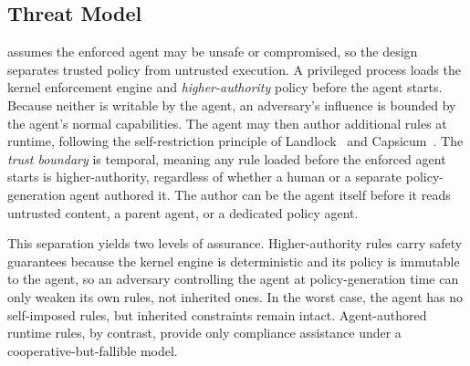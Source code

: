 \subsection{Threat Model}

\sys{} assumes the enforced agent may be unsafe or compromised, so the design separates trusted policy from untrusted execution.
A privileged process loads the kernel enforcement engine and \emph{higher-authority} policy before the agent starts. Because neither is writable by the agent, an adversary's influence is bounded by the agent's normal capabilities.
The agent may then author additional rules at runtime, following the self-restriction principle of Landlock~\cite{landlock} and Capsicum~\cite{watson2010capsicum}.
The \emph{trust boundary} is temporal, meaning any rule loaded before the enforced agent starts is higher-authority, regardless of whether a human or a separate policy-generation agent authored it.
The author can be the agent itself before it reads untrusted content, a parent agent, or a dedicated policy agent.

This separation yields two levels of assurance.
Higher-authority rules carry safety guarantees because the kernel engine is deterministic and its policy is immutable to the agent, so an adversary controlling the agent at policy-generation time can only weaken its own rules, not inherited ones.
In the worst case, the agent has no self-imposed rules, but inherited constraints remain intact.
Agent-authored runtime rules, by contrast, provide only compliance assistance under a cooperative-but-fallible model.

